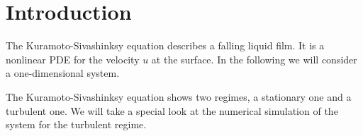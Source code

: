 \section{Introduction}
The Kuramoto-Sivashinksy equation describes a falling liquid film. It is a nonlinear PDE for the velocity $u$ at the surface. In the following we will consider a one-dimensional system.

The Kuramoto-Sivashinksy equation shows two regimes, a stationary one and a turbulent one. We will take a special look at the numerical simulation of the system for the turbulent regime.
